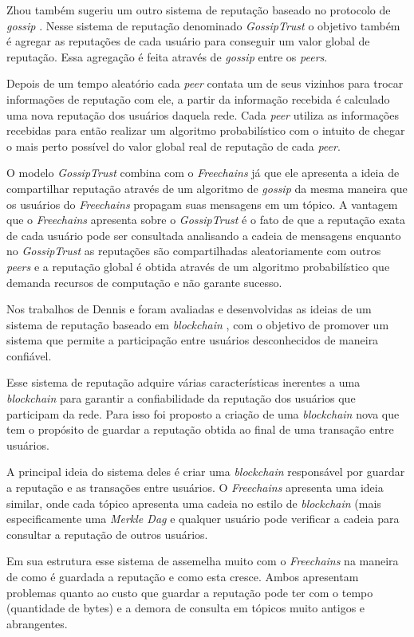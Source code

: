 \documentclass[12pt]{article}
\newcommand{\FC} {\emph{Freechains}\xspace}
\begin{document}
Zhou também sugeriu um outro sistema de reputação baseado no protocolo de \emph{gossip} \cite{zhou2007gossip}. 
Nesse sistema de reputação denominado \emph{GossipTrust} o objetivo também é agregar as reputações de cada usuário para conseguir um valor global de reputação. Essa agregação é feita através de \emph{gossip} entre os \emph{peers}.

Depois de um tempo aleatório cada \emph{peer} contata um de seus vizinhos para trocar informações de reputação com ele, a partir da informação recebida é calculado uma nova reputação dos usuários daquela rede. 
Cada \emph{peer} utiliza as informações recebidas para então realizar um algoritmo probabilístico com o intuito de chegar o mais perto possível do valor global real de reputação de cada \emph{peer}.

O modelo \emph{GossipTrust} combina com o \FC já que ele apresenta a ideia de compartilhar reputação através de um algoritmo de \emph{gossip} da mesma maneira que os usuários do \FC propagam suas mensagens em um tópico. 
A vantagem que o \FC apresenta sobre o \emph{GossipTrust} é o fato de que a reputação exata de cada usuário pode ser consultada analisando a cadeia de mensagens enquanto no \emph{GossipTrust} as reputações são compartilhadas aleatoriamente com outros \emph{peers} e a reputação global é obtida através de um algoritmo probabilístico que demanda recursos de computação e não garante sucesso. 

Nos trabalhos de Dennis e  foram avaliadas e desenvolvidas as ideias de um sistema de reputação baseado em \emph{blockchain} \cite{dennis2015rep} \cite{dennis2016rep}, com o objetivo de promover um sistema que permite a participação entre usuários desconhecidos de maneira confiável. 

Esse sistema de reputação adquire várias características inerentes a uma \emph{blockchain} para garantir a confiabilidade da reputação dos usuários que participam da rede. 
Para isso foi proposto a criação de uma \emph{blockchain} nova que tem o propósito de guardar a reputação obtida ao final de uma transação entre usuários.

A principal ideia do sistema deles é criar uma \emph{blockchain} responsável por guardar a reputação e as transações entre usuários. 
O \FC apresenta uma ideia similar, onde cada tópico apresenta uma cadeia no estilo de \emph{blockchain} (mais especificamente uma \emph{Merkle Dag} e qualquer usuário pode verificar a cadeia para consultar a reputação de outros usuários.

Em sua estrutura esse sistema de assemelha muito com o \FC na maneira de como é guardada a reputação e como esta cresce. 
Ambos apresentam problemas quanto ao custo que guardar a reputação pode ter com o tempo (quantidade de bytes) e a demora de consulta em tópicos muito antigos e abrangentes.
\end{document}
